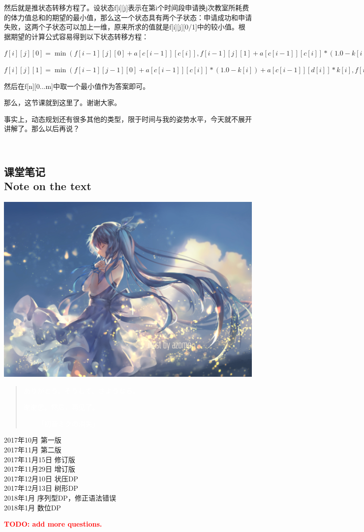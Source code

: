 \documentclass{article}
\theoremstyle{nonumberplain}
\newcommand{\note}{\ \par
	\subsection*{课堂笔记\\\tiny{Note on the text}}
	\newpage}
\begin{document}
	然后就是推状态转移方程了。设状态f[i][j]表示在第i个时间段申请换j次教室所耗费的体力值总和的期望的最小值，那么这一个状态具有两个子状态：申请成功和申请失败，这两个子状态可以加上一维，原来所求的值就是f[i][j][0/1]中的较小值。根据期望的计算公式容易得到以下状态转移方程：

$f[i][j][0]=\min(f[i-1][j][0]+a[c[i-1]][c[i]],f[i-1][j][1]+a[c[i-1]][c[i]]*(1.0-k[i-1])+a[d[i-1]][c[i]]*k[i-1]); $

$f[i][j][1]=\min(f[i-1][j-1][0]+a[c[i-1]][c[i]]*(1.0-k[i])+a[c[i-1]][d[i]]*k[i],f[i-1][j-1][1]+a[c[i-1]][c[i]]*(1.0-k[i])*(1.0-k[i-1])+a[d[i-1]][c[i]]*k[i-1]*(1.0-k[i])+a[c[i-1]][d[i]]*(1.0-k[i-1])*(k[i])+a[d[i-1]][d[i]]*k[i-1]*k[i]);$

然后在f[n][0...m]中取一个最小值作为答案即可。

那么，这节课就到这里了。谢谢大家。

事实上，动态规划还有很多其他的类型，限于时间与我的姿势水平，今天就不展开讲解了。那么以后再说？

\note

\begin{center}\includegraphics[scale=0.65]{61438972_p0.jpg}\end{center}
\begin{quote}
	\textcolor{white}{ありがとう。そうして、さようなら。}

	\textcolor{white}{谢谢您。然后，再见了。}
	\begin{flushright}\textcolor{white}{------「初音ミクの消失」}\end{flushright}
\end{quote}
\begin{flushright}
	2017年10月 第一版\\
	2017年11月 第二版\\
	2017年11月15日 修订版\\
	2017年11月29日 增订版\\
	2017年12月10日 状压DP\\
	2017年12月13日 树形DP\\
	2018年1月 序列型DP，修正语法错误\\
	2018年1月 数位DP\\
\end{flushright}
\begin{center}\textcolor{red}{\huge{\textbf{TODO: add more questions.}}}\end{center}
\end{document}

